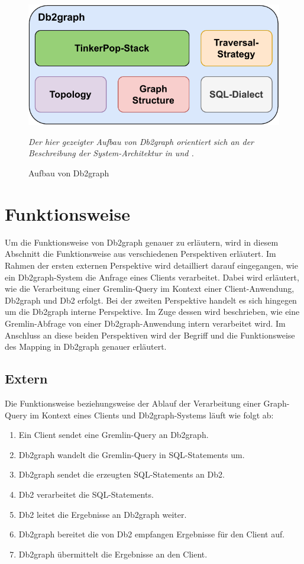 \begin{figure}[h]
    \centering
    \includegraphics[width=\textwidth]{images/db2graph_components.pdf}
    \caption{Aufbau von Db2graph}
    \label{fig:db2graph_aufbau}
    \vspace{0.5em}
    \textit{Der hier gezeigter Aufbau von Db2graph   orientiert sich an der Beschreibung der System-Architektur in \cite{vldb_tian} und \cite{sigmod_tian}.}
\end{figure}

\section{Funktionsweise}
\label{db2graph:funktionsweise}
Um die Funktionsweise von Db2graph genauer zu erläutern, wird in diesem Abschnitt die Funktionsweise aus verschiedenen Perspektiven erläutert. Im Rahmen der ersten externen Perspektive wird detailliert darauf eingegangen, wie ein Db2graph-System die Anfrage eines Clients verarbeitet. Dabei wird erläutert, wie die Verarbeitung einer Gremlin-Query im Kontext einer Client-Anwendung, Db2graph und Db2 erfolgt. Bei der zweiten Perspektive handelt es sich hingegen um die Db2graph interne Perspektive. Im Zuge dessen wird beschrieben, wie eine Gremlin-Abfrage von einer Db2graph-Anwendung intern verarbeitet wird. Im Anschluss an diese beiden Perspektiven wird der Begriff und die Funktionsweise des Mapping in Db2graph genauer erläutert.

\subsection{Extern}
Die Funktionsweise beziehungsweise der Ablauf der Verarbeitung einer Graph-Query im Kontext eines Clients und Db2graph-Systems läuft wie folgt ab:

\begin{enumerate}
    \item Ein Client sendet eine Gremlin-Query an Db2graph. 
    \item Db2graph wandelt die Gremlin-Query in SQL-Statements um. 
    \item Db2graph sendet die erzeugten SQL-Statements an Db2.
    \item Db2 verarbeitet die SQL-Statements.
    \item Db2 leitet die Ergebnisse an Db2graph weiter.
    \item Db2graph bereitet die von Db2 empfangen Ergebnisse für den Client auf. 
    \item Db2graph übermittelt die Ergebnisse an den Client.
\end{enumerate}

